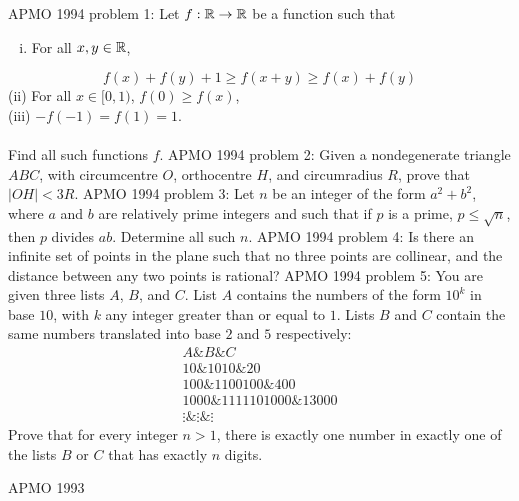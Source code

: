 APMO 1994 problem 1:  Let $f: \Bbb{R} \rightarrow \Bbb{R}$ be a function such that
\begin{enumerate}[(i)]
  \item For all $x,y \in \Bbb{R}$,
\end{enumerate}
\[ f(x)+f(y)+1 \geq f(x+y) \geq f(x)+f(y) \]
(ii) For all $x \in [0,1)$, $f(0) \geq f(x)$, \\
(iii) $-f(-1) = f(1) = 1$. \\\\
Find all such functions $f$. 
APMO 1994 problem 2:  Given a nondegenerate triangle $ABC$, with circumcentre $O$, orthocentre $H$, and circumradius $R$, prove that $|OH| < 3R$. 
APMO 1994 problem 3:  Let $n$ be an integer of the form $a^2 + b^2$, where $a$ and $b$ are relatively prime integers and such that if $p$ is a prime, $p \leq \sqrt{n}$, then $p$ divides $ab$.  Determine all such $n$. 
APMO 1994 problem 4:  Is there an infinite set of points in the plane such that no three points are collinear, and the distance between any two points is rational? 
APMO 1994 problem 5:  You are given three lists $A$, $B$, and $C$.  List $A$ contains the numbers of the form $10^k$ in base $10$, with $k$ any integer greater than or equal to $1$.  Lists $B$ and $C$ contain the same numbers translated into base $2$ and $5$ respectively:
\[
\begin{array}{lll} A \& B \& C \\ 10 \& 1010 \& 20 \\ 100 \& 1100100 \& 400 \\ 1000 \& 1111101000 \& 13000 \\ \vdots \& \vdots \& \vdots \end{array}
\]
Prove that for every integer $n > 1$, there is exactly one number in exactly one of the lists $B$ or $C$ that has exactly $n$ digits. 

APMO 1993 

